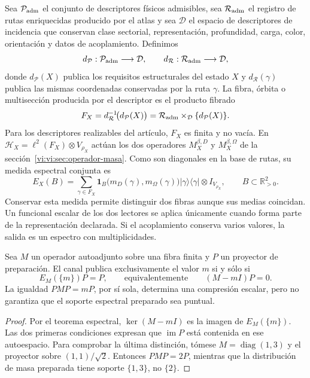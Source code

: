 Sea \(\mathcal P_{\rm adm}\) el conjunto de descriptores físicos admisibles,
sea \(\mathcal R_{\rm adm}\) el registro de rutas enriquecidas producido por
el atlas y sea \(\mathcal D\) el espacio de descriptores de incidencia que
conservan clase sectorial, representación, profundidad, carga, color,
orientación y datos de acoplamiento. Definimos
\[
 d_{\mathcal P}:\mathcal P_{\rm adm}\longrightarrow\mathcal D,
 \qquad
 d_{\mathcal R}:\mathcal R_{\rm adm}\longrightarrow\mathcal D,
\]
donde \(d_{\mathcal P}(X)\) publica los requisitos estructurales del estado
\(X\) y \(d_{\mathcal R}(\gamma)\) publica las mismas coordenadas conservadas
por la ruta \(\gamma\). La fibra, órbita o multisección producida por el
descriptor es el producto fibrado
\begin{equation}
 F_X=d_{\mathcal R}^{-1}\!\bigl(d_{\mathcal P}(X)\bigr)
 =\mathcal R_{\rm adm}\times_{\mathcal D}\{d_{\mathcal P}(X)\}.
 \label{vi:vi:eq:fibra-descriptor}
\end{equation}
Para los descriptores realizables del artículo, \(F_X\) es finita y no vacía.
En
\(\mathcal H_X=\ell^2(F_X)\otimes V_{\rho_X}\) actúan los dos operadores
\(M_X^{\beta,D}\) y \(M_X^{\beta,\Omega}\) de la
sección~\ref{vi:vi:sec:operador-masa}. Como son diagonales en la base de
rutas, su medida espectral conjunta es
\begin{equation}
 E_X(B)=\sum_{\gamma\in F_X}
 \mathbf1_B\bigl(m_D(\gamma),m_\Omega(\gamma)\bigr)
 |\gamma\rangle\langle\gamma|\otimes I_{V_{\rho_X}},
 \qquad B\subset\mathbb R_{>0}^2.
 \label{vi:vi:eq:familias-pvm}
\end{equation}
Conservar esta medida permite distinguir dos fibras aunque sus medias
coincidan. Un funcional escalar de los dos lectores se aplica únicamente
cuando forma parte de la representación declarada. Si el acoplamiento
conserva varios valores, la salida es un espectro con multiplicidades.

\begin{proposition}
\label{vi:vi:prop:familias-linea}
Sea \(M\) un operador autoadjunto sobre una fibra finita y \(P\) un
proyector de preparación. El canal publica exclusivamente el valor \(m\)
si y sólo si
\[
 E_M(\{m\})P=P,
 \qquad\text{equivalentemente}\qquad (M-mI)P=0.
\]
La igualdad \(PMP=mP\), por sí sola, determina una compresión escalar,
pero no garantiza que el soporte espectral preparado sea puntual.
\end{proposition}
\begin{proof}
Por el teorema espectral, \(\ker(M-mI)\) es la imagen de
\(E_M(\{m\})\). Las dos primeras condiciones expresan que
\(\operatorname{im}P\) está contenida en ese autoespacio. Para comprobar
la última distinción, tómese \(M=\operatorname{diag}(1,3)\) y el proyector
sobre \((1,1)/\sqrt2\). Entonces \(PMP=2P\), mientras que la distribución
de masa preparada tiene soporte \(\{1,3\}\), no \(\{2\}\).
\end{proof}

